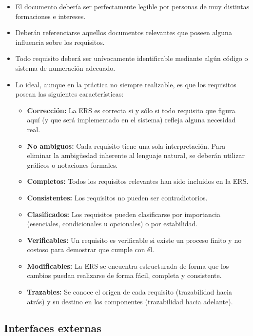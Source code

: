 \documentclass[12pt,a4paper]{article}
\begin{document}
\begin{itemize}
    \item El documento debería ser perfectamente legible por personas de muy distintas formaciones e intereses.
    \item Deberán referenciarse aquellos documentos relevantes que poseen alguna influencia sobre los requisitos.
    \item Todo requisito deberá ser unívocamente identificable mediante algún código o sistema de numeración adecuado.
    \item Lo ideal, aunque en la práctica no siempre realizable, es que los requisitos posean las siguientes características: 
    \begin{itemize}
        \item \textbf{Corrección:} La ERS es correcta si y sólo si todo requisito que figura aquí (y que será implementado en el sistema) refleja alguna necesidad real.
        \item \textbf{No ambiguos:} Cada requisito tiene una sola interpretación. Para eliminar la ambigüedad inherente al lenguaje natural, se deberán utilizar gráficos o notaciones formales.
        \item \textbf{Completos:} Todos los requisitos relevantes han sido incluidos en la ERS.
        \item \textbf{Consistentes:} Los requisitos no pueden ser contradictorios.
        \item \textbf{Clasificados:} Los requisitos pueden clasificarse por importancia (esenciales, condicionales u opcionales) o por estabilidad.
        \item \textbf{Verificables:} Un requisito es verificable si existe un proceso finito y no costoso para demostrar que cumple con él.
        \item \textbf{Modificables:} La ERS se encuentra estructurada de forma que los cambios puedan realizarse de forma fácil, completa y consistente.
        \item \textbf{Trazables:} Se conoce el origen de cada requisito (trazabilidad hacia atrás) y su destino en los componentes (trazabilidad hacia adelante).
    \end{itemize}
\end{itemize}

\subsection{Interfaces externas}
\label{sec:interfaces_externas}
\end{document}
